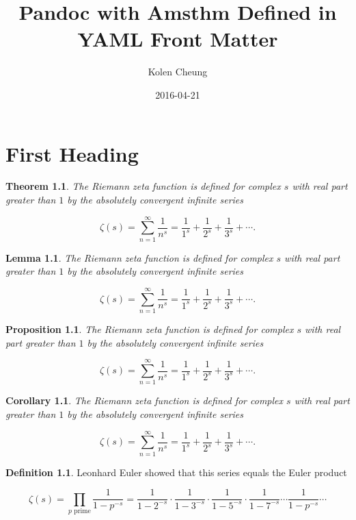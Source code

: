 \documentclass[english,oneside, article]{memoir}
\title{Pandoc with Amsthm Defined in YAML Front Matter}
\author{Kolen Cheung}
\date{2016-04-21}
\theoremstyle{plain}
\newtheorem{Theorem}{Theorem}[chapter]
\newtheorem*{Lemma}{Lemma}
\newtheorem*{Proposition}{Proposition}
\newtheorem*{Corollary}{Corollary}
\theoremstyle{definition}
\newtheorem{Definition}{Definition}[chapter]
\theoremstyle{remark}
\begin{document}
\maketitle

{
\hypersetup{linkcolor=black}
\setcounter{tocdepth}{5}
\tableofcontents
}
\chapter{First Heading}\label{first-heading}

\begin{Theorem}

The Riemann zeta function is defined for complex \(s\) with real part
greater than \(1\) by the absolutely convergent infinite series

\[\zeta(s) = \sum_{n=1}^\infty \frac{1}{n^s} = \frac{1}{1^s} + \frac{1}{2^s} + \frac{1}{3^s} + \cdots.\]

\end{Theorem}

\begin{Lemma}

The Riemann zeta function is defined for complex \(s\) with real part
greater than \(1\) by the absolutely convergent infinite series

\[\zeta(s) = \sum_{n=1}^\infty \frac{1}{n^s} = \frac{1}{1^s} + \frac{1}{2^s} + \frac{1}{3^s} + \cdots.\]

\end{Lemma}

\begin{Proposition}

The Riemann zeta function is defined for complex \(s\) with real part
greater than \(1\) by the absolutely convergent infinite series

\[\zeta(s) = \sum_{n=1}^\infty \frac{1}{n^s} = \frac{1}{1^s} + \frac{1}{2^s} + \frac{1}{3^s} + \cdots.\]

\end{Proposition}

\begin{Corollary}

The Riemann zeta function is defined for complex \(s\) with real part
greater than \(1\) by the absolutely convergent infinite series

\[\zeta(s) = \sum_{n=1}^\infty \frac{1}{n^s} = \frac{1}{1^s} + \frac{1}{2^s} + \frac{1}{3^s} + \cdots.\]

\end{Corollary}

\begin{Definition}

Leonhard Euler showed that this series equals the Euler product

\[\zeta(s) = \prod_{p \text{ prime}} \frac{1}{1-p^{-s}}= \frac{1}{1-2^{-s}}\cdot\frac{1}{1-3^{-s}}\cdot\frac{1}{1-5^{-s}}\cdot\frac{1}{1-7^{-s}} \cdots \frac{1}{1-p^{-s}} \cdots\]

\end{Definition}
\end{document}
